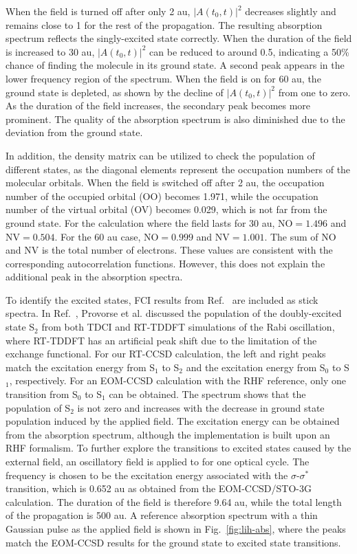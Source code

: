 When the field is turned off after only 2 au, $|A(t_{0}, t)|^{2}$ decreases slightly and remains close to 1 for the rest of the propagation. The resulting absorption spectrum reflects the singly-excited state correctly. When the duration of the field is increased to 30 au, $|A(t_{0}, t)|^{2}$ can be reduced to around 0.5, indicating a 50\% chance of finding the molecule in its ground state. A second peak appears in the lower frequency region of the spectrum. When the field is on for 60 au, the ground state is depleted, as shown by the decline of $|A(t_{0}, t)|^{2}$ from one to zero. As the duration of the field increases, the secondary peak becomes more prominent. The quality of the absorption spectrum is also diminished due to the deviation from the ground state.

In addition, the density matrix can be utilized to check the population of different states, as the diagonal elements represent the occupation numbers of the molecular orbitals. When the field is switched off after 2 au, the occupation number of the occupied orbital (OO) becomes 1.971, while the occupation number of the virtual orbital (OV) becomes 0.029, which is not far from the ground state. For the calculation where the field lasts for 30 au, NO$=1.496$ and NV$=0.504$. For the 60 au case, NO$=0.999$ and NV$=1.001$. The sum of NO and NV is the total number of electrons. These values are consistent with the corresponding autocorrelation functions. However, this does not explain the additional peak in the absorption spectra.

To identify the excited states, FCI results from Ref.~ are included as stick spectra. In Ref.~, Provorse et al. discussed the population of the doubly-excited state S$_{2}$ from both TDCI and RT-TDDFT simulations of the Rabi oscillation, where RT-TDDFT has an artificial peak shift due to the limitation of the exchange functional. For our RT-CCSD calculation, the left and right peaks match the excitation energy from S$_{1}$ to S$_{2}$ and the excitation energy from S$_{0}$ to S$_{1}$, respectively. For an EOM-CCSD calculation with the RHF reference, only one transition from S$_{0}$ to S$_{1}$ can be obtained. The spectrum shows that the population of S$_{2}$ is not zero and increases with the decrease in ground state population induced by the applied field. The excitation energy can be obtained from the absorption spectrum, although the implementation is built upon an RHF formalism.
\label{results-cc3-322}
To further explore the transitions to excited states caused by the external field, an oscillatory field is applied to  for one optical cycle. The frequency is chosen to be the excitation energy associated with the $\sigma$-$\sigma^{*}$ transition, which is 0.652 au as obtained from the EOM-CCSD/STO-3G calculation. The duration of the field is therefore 9.64 au, while the total length of the propagation is 500 au. A reference absorption spectrum with a thin Gaussian pulse as the applied field is shown in Fig.~\ref{fig:lih-abs}, where the peaks match the EOM-CCSD results for the ground state to excited state transitions.

